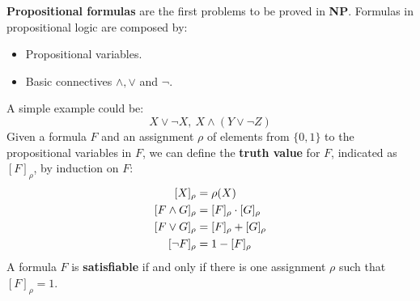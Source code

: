 \textbf{Propositional formulas} are the first problems to be proved in \textbf{NP}. Formulas in propositional logic are composed by:
\begin{itemize}
    \renewcommand{\labelitemi}{-}
    \item Propositional variables.
    \item Basic connectives $\wedge, \vee$ and $\neg$.
\end{itemize}
A simple example could be:
$$X \vee \neg X, \ X \wedge (Y \vee \neg Z)$$
Given a formula $F$ and an assignment $\rho$ of elements from $\{0,1\}$ to the propositional variables in $F$, we can define the \textbf{truth value} for $F$,
indicated as $[F]_{\rho}$, by induction on $F$:
$$
    \begin{aligned}
        \relax [X]_{\rho} & = \rho(X) \\ 
        [F \wedge G]_{\rho} & = [F]_{\rho} \cdot [G]_{\rho} \\
        [F \vee G]_{\rho} & = [F]_{\rho} + [G]_{\rho} \\     
        [\neg F]_{\rho} & = 1 - [F]_{\rho}
    \end{aligned}
$$
A formula $F$ is \textbf{satisfiable} if and only if there is one assignment $\rho$ such that $[F]_{\rho} = 1$.